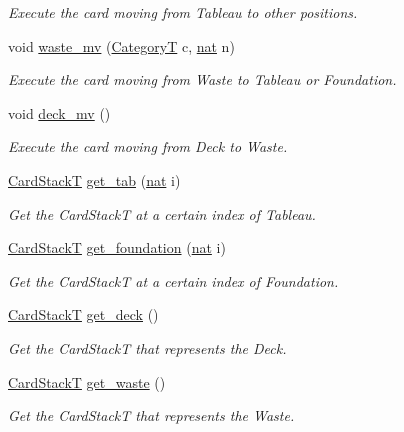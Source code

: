 \begin{DoxyCompactItemize}
\begin{DoxyCompactList}\small\item\em Execute the card moving from Tableau to other positions. \end{DoxyCompactList}\item 
void \hyperlink{class_board_t_adb96accaa92d62594a5cc83e0574a1ed}{waste\+\_\+mv} (\hyperlink{_card_types_8h_aa77f81f8d4c8aa57046a50ca32d6b7b4}{CategoryT} c, \hyperlink{_card_types_8h_a56638ee9d162e8cce3a15f92d2023d6e}{nat} n)
\begin{DoxyCompactList}\small\item\em Execute the card moving from Waste to Tableau or Foundation. \end{DoxyCompactList}\item 
void \hyperlink{class_board_t_a548e3e518666a6f38b49e072a88a6d2c}{deck\+\_\+mv} ()
\begin{DoxyCompactList}\small\item\em Execute the card moving from Deck to Waste. \end{DoxyCompactList}\item 
\hyperlink{class_stack}{Card\+StackT} \hyperlink{class_board_t_a5cadb578ee4cf95b8fe10b63c08e6041}{get\+\_\+tab} (\hyperlink{_card_types_8h_a56638ee9d162e8cce3a15f92d2023d6e}{nat} i)
\begin{DoxyCompactList}\small\item\em Get the Card\+StackT at a certain index of Tableau. \end{DoxyCompactList}\item 
\hyperlink{class_stack}{Card\+StackT} \hyperlink{class_board_t_a36b248009b981480065f741a0249809f}{get\+\_\+foundation} (\hyperlink{_card_types_8h_a56638ee9d162e8cce3a15f92d2023d6e}{nat} i)
\begin{DoxyCompactList}\small\item\em Get the Card\+StackT at a certain index of Foundation. \end{DoxyCompactList}\item 
\hyperlink{class_stack}{Card\+StackT} \hyperlink{class_board_t_a2f28e0a5e9c34f396e2aebc79342a225}{get\+\_\+deck} ()
\begin{DoxyCompactList}\small\item\em Get the Card\+StackT that represents the Deck. \end{DoxyCompactList}\item 
\hyperlink{class_stack}{Card\+StackT} \hyperlink{class_board_t_a1e3a7edd2e993d22a453da1487177585}{get\+\_\+waste} ()
\begin{DoxyCompactList}\small\item\em Get the Card\+StackT that represents the Waste. \end{DoxyCompactList}\item 

\end{DoxyCompactItemize}
